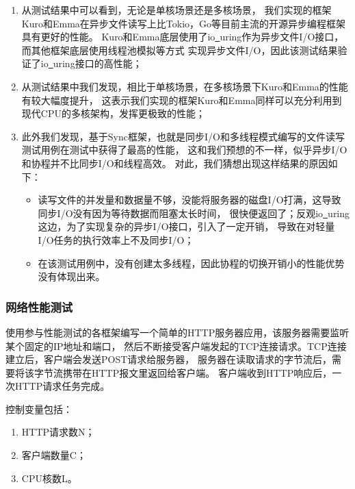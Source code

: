 \documentclass[supercite]{HustGraduPaper}
\theoremstyle{definition}
\begin{document}
\begin{enumerate}
  \item 从测试结果中可以看到，无论是单核场景还是多核场景，
    我们实现的框架Kuro和Emma在异步文件读写上比Tokio，Go等目前主流的开源异步编程框架具有更好的性能。
    Kuro和Emma底层使用了io\underline{~}uring作为异步文件I/O接口，而其他框架底层使用线程池模拟等方式
    实现异步文件I/O，因此该测试结果验证了io\underline{~}uring接口的高性能；
  \item 从测试结果中我们发现，相比于单核场景，在多核场景下Kuro和Emma的性能有较大幅度提升，
    这表示我们实现的框架Kuro和Emma同样可以充分利用到现代CPU的多核架构，发挥更极致的性能；
  \item 此外我们发现，基于Sync框架，也就是同步I/O和多线程模式编写的文件读写测试用例在测试中获得了最高的性能，
    这和我们预想的不一样，似乎异步I/O和协程并不比同步I/O和线程高效。
    对此，我们猜想出现这样结果的原因如下：
    \begin{itemize}
      \item 读写文件的并发量和数据量不够，没能将服务器的磁盘I/O打满，这导致同步I/O没有因为等待数据而阻塞太长时间，
        很快便返回了；反观io\underline{~}uring这边，为了实现复杂的异步I/O接口，引入了一定开销，
        导致在对轻量I/O任务的执行效率上不及同步I/O；
      \item 在该测试用例中，没有创建太多线程，因此协程的切换开销小的性能优势没有体现出来。
    \end{itemize}
\end{enumerate}

\subsubsection{网络性能测试}


使用参与性能测试的各框架编写一个简单的HTTP服务器应用，该服务器需要监听某个固定的IP地址和端口，
然后不断接受客户端发起的TCP连接请求。TCP连接建立后，客户端会发送POST请求给服务器，
服务器在读取请求的字节流后，需要将该字节流携带在HTTP报文里返回给客户端。
客户端收到HTTP响应后，一次HTTP请求任务完成。\par

控制变量包括：

\begin{enumerate}
  \item HTTP请求数N；
  \item 客户端数量C；
  \item CPU核数L。
\end{enumerate}
\end{document}
